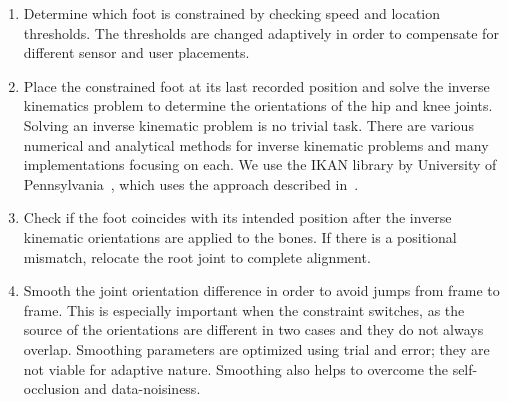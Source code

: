 \begin{enumerate}
\item Determine which foot is constrained by checking speed and location thresholds. The thresholds are changed adaptively in order to compensate for different sensor and user placements.

\item Place the constrained foot at its last recorded position and solve the inverse kinematics problem to determine the orientations of the hip and knee joints. Solving an inverse kinematic problem is no trivial task. There are various numerical and analytical methods for inverse kinematic problems and many implementations focusing on each. We use the IKAN library by University of Pennsylvania~\cite{IKAN2013}, which uses the approach described in~\cite{Tolani2000}.  

\item Check if the foot coincides with its intended position after the inverse kinematic orientations are applied to the bones. If there is a positional mismatch, relocate the root joint to complete alignment.

\item Smooth the joint orientation difference in order to avoid jumps from frame to frame. This is especially important when the constraint switches, as the source of the orientations are different in two cases and they do not always overlap. Smoothing parameters are optimized using trial and error; they are not viable for adaptive nature. Smoothing also helps to overcome the self-occlusion and data-noisiness.
\end{enumerate}
  
